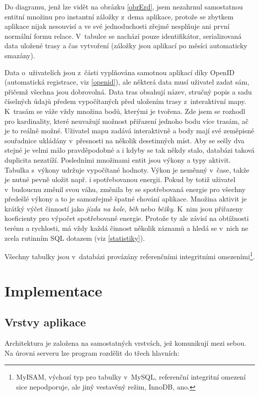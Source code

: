 Do diagramu, jenž lze vidět na obrázku \ref{obrErd}, jsem nezahrnul samostatnou
entitní množinu pro instantní záložky z~dema aplikace, protože se
zbytkem aplikace nijak nesouvisí a ve své jednoduchosti
zřejmě nesplňuje ani první normální formu relace. V~tabulce se
nachází pouze identifikátor, serializovaná data uložené trasy a čas vytvoření
(záložky jsou aplikací po měsíci automaticky smazány).

Data o~uživatelích jsou z~části vyplňována samotnou aplikací díky
OpenID (automatická registrace, viz \ref{openid}), ale některá data musí
uživatel zadat sám, přičemž všechna jsou dobrovolná. Data tras obsahují
název, stručný popis a sadu číselných údajů předem vypočítaných před
uložením trasy z~interaktivní mapy. K~trasám se váže vždy množina
bodů, kterými je tvořena. Zde jsem se rozhodl pro kardinality, které
neuvažují možnost přiřazení jednoho bodu více trasám, ač je to
reálně možné. Uživatel mapu zadává interaktivně a body mají své
zeměpisné souřadnice ukládány v~přesnosti na několik desetinných
míst. Aby se sešly dva stejné je velmi málo pravděpodobné a i kdyby
se tak někdy stalo, databázi taková duplicita nezatíží.
Posledními množinami entit jsou výkony a typy aktivit. Tabulka
s~výkony udržuje vypočítané hodnoty. Výkon je neměnný v~čase,
takže je nutné pevně uložit např. i spotřebovanou energii. Pokud by
totiž uživatel v~budoucnu změnil svou váhu, změnila by se
spotřebovaná energie pro všechny předešlé výkony a to je samozřejmě
špatné chování aplikace. Množina aktivit je krátký výčet činností
jako {\it jízda na kole}, {\it běh} nebo {\it běžky}. K~nim jsou
přiřazeny koeficienty pro výpočet spotřebované energie. Protože ty
ale závisí na obtížnosti terénu a rychlosti, má vždy každá činnost
několik záznamů a hledá se v~nich ne zcela rutinním SQL dotazem (viz
\ref{statistiky}).

Všechny tabulky jsou v~databázi provázány referenčními integritními
omezeními\footnote{MyISAM, výchozí typ pro tabulky v~MySQL,
referenční integritní omezení sice nepodporuje, ale jiný vestavěný
režim, InnoDB, ano.}.

\chapter{Implementace}

\section{Vrstvy aplikace}
Architektura je založena na samostatných vrstvách, jež komunikují
mezi sebou. Na úrovni serveru lze program rozdělit do třech hlavních:

